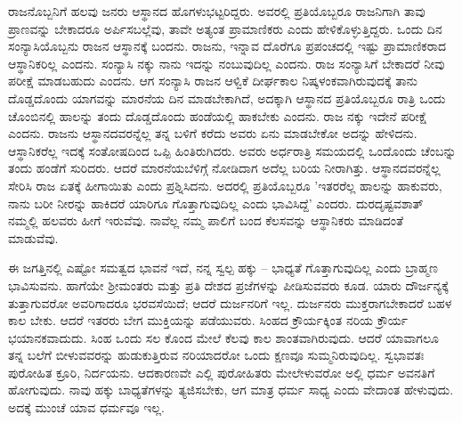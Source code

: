 ರಾಜನೊಬ್ಬನಿಗೆ ಹಲವು ಜನರು ಆಸ್ಥಾನದ ಹೊಗಳುಭಟ್ಟರಿದ್ದರು. ಅವರಲ್ಲಿ ಪ್ರತಿಯೊಬ್ಬರೂ ರಾಜನಿಗಾಗಿ ತಾವು ಪ್ರಾಣವನ್ನು ಬೇಕಾದರೂ ಅರ್ಪಿಸಬಲ್ಲೆವು, ತಾವೇ ಅತ್ಯಂತ ಪ್ರಾಮಾಣಿಕರು ಎಂದು ಹೇಳಿಕೊಳ್ಳುತ್ತಿದ್ದರು. ಒಂದು ದಿನ ಸಂನ್ಯಾಸಿಯೊಬ್ಬನು ರಾಜನ ಆಸ್ಥಾನಕ್ಕೆ ಬಂದನು. ರಾಜನು, ಇನ್ನಾವ ದೊರೆಗೂ ಪ್ರಪಂಚದಲ್ಲಿ ಇಷ್ಟು ಪ್ರಾಮಾಣಿಕರಾದ ಆಸ್ಥಾನಿಕರಿಲ್ಲ ಎಂದನು. ಸಂನ್ಯಾಸಿ ನಕ್ಕು ನಾನು ಇದನ್ನು ನಂಬುವುದಿಲ್ಲ ಎಂದನು. ರಾಜ ಸಂನ್ಯಾಸಿಗೆ ಬೇಕಾದರೆ ನೀವು ಪರೀಕ್ಷೆ ಮಾಡಬಹುದು ಎಂದನು. ಆಗ ಸಂನ್ಯಾಸಿ ರಾಜನ ಆಳ್ವಿಕೆ ದೀರ್ಘಕಾಲ ನಿಷ್ಕಳಂಕವಾಗಿರುವುದಕ್ಕೆ ತಾನು ದೊಡ್ಡದೊಂದು ಯಾಗವನ್ನು ಮಾರನೆಯ ದಿನ ಮಾಡಬೇಕಾಗಿದೆ, ಅದಕ್ಕಾಗಿ ಆಸ್ಥಾನದ ಪ್ರತಿಯೊಬ್ಬರೂ ರಾತ್ರಿ ಒಂದು ಚೊಂಬಿನಲ್ಲಿ ಹಾಲನ್ನು ತಂದು ದೊಡ್ಡದೊಂದು ಹಂಡೆಯಲ್ಲಿ ಹಾಕಬೇಕು ಎಂದನು. ರಾಜ ನಕ್ಕು ಇದೇನೆ ಪರೀಕ್ಷೆ ಎಂದನು. ರಾಜನು ಆಸ್ಥಾನದವರನ್ನೆಲ್ಲ ತನ್ನ ಬಳಿಗೆ ಕರೆದು ಅವರು ಏನು ಮಾಡಬೇಕೋ ಅದನ್ನು ಹೇಳಿದನು. ಆಸ್ಥಾನಿಕರೆಲ್ಲ ಇದಕ್ಕೆ ಸಂತೋಷದಿಂದ ಒಪ್ಪಿ ಹಿಂತಿರುಗಿದರು. ಅವರು ಅರ್ಧರಾತ್ರಿ ಸಮಯದಲ್ಲಿ ಒಂದೊಂದು ಚೆಂಬನ್ನು ತಂದು ಹಂಡೆಗೆ ಸುರಿದರು. ಆದರೆ ಮಾರನೆಯಬೆಳಿಗ್ಗೆ ನೋಡಿದಾಗ ಅದೆಲ್ಲ ಬರಿಯ ನೀರಾಗಿತ್ತು. ಆಸ್ಥಾನದವರನ್ನೆಲ್ಲ ಸೇರಿಸಿ ರಾಜ ಏತಕ್ಕೆ ಹೀಗಾಯಿತು ಎಂದು ಪ್ರಶ್ನಿಸಿದನು. ಅದರಲ್ಲಿ ಪ್ರತಿಯೊಬ್ಬರೂ 'ಇತರರೆಲ್ಲ ಹಾಲನ್ನು ಹಾಕುವರು, ನಾನು ಬರೀ ನೀರನ್ನು ಹಾಕಿದರೆ ಯಾರಿಗೂ ಗೊತ್ತಾಗುವುದಿಲ್ಲ ಎಂದು ಭಾವಿಸಿದ್ದೆ' ಎಂದರು. ದುರದೃಷ್ಟವಶಾತ್ ನಮ್ಮಲ್ಲಿ ಹಲವರು ಹೀಗೆ ಇರುವೆವು. ನಾವೆಲ್ಲ ನಮ್ಮ ಪಾಲಿಗೆ ಬಂದ ಕೆಲಸವನ್ನು ಆಸ್ಥಾನಿಕರು ಮಾಡಿದಂತೆ ಮಾಡುವೆವು.

ಈ ಜಗತ್ತಿನಲ್ಲಿ ಎಷ್ಟೋ ಸಮತ್ವದ ಭಾವನೆ ಇದೆ, ನನ್ನ ಸ್ವಲ್ಪ ಹಕ್ಕು – ಭಾಧ್ಯತೆ ಗೊತ್ತಾಗುವುದಿಲ್ಲ ಎಂದು ಬ್ರಾಹ್ಮಣ ಭಾವಿಸುವನು. ಹಾಗೆಯೇ ಶ‍್ರೀಮಂತರು ಮತ್ತು ಪ್ರತಿ ದೇಶದ ಪ್ರಜೆಗಳನ್ನು ಪೀಡಿಸುವವರು ಕೂಡ. ಯಾರು ದೌರ್ಜನ್ಯಕ್ಕೆ ತುತ್ತಾಗುವರೋ ಅವರಿಗಾದರೂ ಭರವಸೆಯಿದೆ; ಆದರೆ ದುರ್ಜನರಿಗೆ ಇಲ್ಲ. ದುರ್ಜನರು ಮುಕ್ತರಾಗಬೇಕಾದರೆ ಬಹಳ ಕಾಲ ಬೇಕು. ಆದರೆ ಇತರರು ಬೇಗ ಮುಕ್ತಿಯನ್ನು ಪಡೆಯುವರು. ಸಿಂಹದ ಕ್ರೌರ್ಯಕ್ಕಿಂತ ನರಿಯ ಕ್ರೌರ್ಯ ಭಯಾನಕವಾದುದು. ಸಿಂಹ ಒಂದು ಸಲ ಕೊಂದ ಮೇಲೆ ಕೆಲವು ಕಾಲ ಶಾಂತವಾಗಿರುವುದು. ಆದರೆ ಯಾವಾಗಲೂ ತನ್ನ ಬಲೆಗೆ ಬೀಳುವವರನ್ನು ಹುಡುಕುತ್ತಿರುವ ನರಿಯಾದರೋ ಒಂದು ಕ್ಷಣವೂ ಸುಮ್ಮನಿರುವುದಿಲ್ಲ. ಸ್ವಭಾವತಃ ಪುರೋಹಿತ ಕ್ರೂರಿ, ನಿರ್ದಯನು. ಆದಕಾರಣವೇ ಎಲ್ಲಿ ಪುರೋಹಿತರು ಮೇಲೇಳುವರೋ ಅಲ್ಲಿ ಧರ್ಮ ಅವನತಿಗೆ ಹೋಗುವುದು. ನಾವು ಹಕ್ಕು ಬಾಧ್ಯತೆಗಳನ್ನು ತ್ಯಜಿಸಬೇಕು, ಆಗ ಮಾತ್ರ ಧರ್ಮ ಸಾಧ್ಯ ಎಂದು ವೇದಾಂತ ಹೇಳುವುದು. ಅದಕ್ಕೆ ಮುಂಚೆ ಯಾವ ಧರ್ಮವೂ ಇಲ್ಲ.


